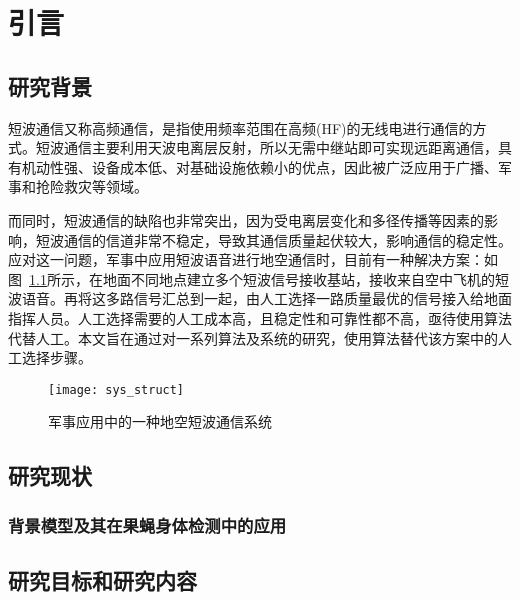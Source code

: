 
\chapter{引言}
\label{chapter:introduction}

\section{研究背景}

短波通信又称高频通信，是指使用频率范围在高频(HF)的无线电进行通信的方式\cite{董彬虹2007短波通信的现状及发展趋势}。短波通信主要利用天波电离层反射，所以无需中继站即可实现远距离通信，具有机动性强、设备成本低、对基础设施依赖小的优点，因此被广泛应用于广播、军事和抢险救灾等领域。

而同时，短波通信的缺陷也非常突出，因为受电离层变化和多径传播等因素的影响，短波通信的信道非常不稳定，导致其通信质量起伏较大，影响通信的稳定性。应对这一问题，军事中应用短波语音进行地空通信时，目前有一种解决方案：如图~\ref{fig:sys_struct}所示，在地面不同地点建立多个短波信号接收基站，接收来自空中飞机的短波语音。再将这多路信号汇总到一起，由人工选择一路质量最优的信号接入给地面指挥人员。人工选择需要的人工成本高，且稳定性和可靠性都不高，亟待使用算法代替人工。本文旨在通过对一系列算法及系统的研究，使用算法替代该方案中的人工选择步骤。

\begin{figure}
\centering
\texttt{[image: sys\_struct]}
\caption{军事应用中的一种地空短波通信系统\label{fig:sys_struct}}
\end{figure}

\section{研究现状}


\subsection{背景模型及其在果蝇身体检测中的应用}


\section{研究目标和研究内容}

